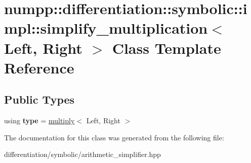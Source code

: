 \hypertarget{classnumpp_1_1differentiation_1_1symbolic_1_1impl_1_1simplify__multiplication}{}\section{numpp\+:\+:differentiation\+:\+:symbolic\+:\+:impl\+:\+:simplify\+\_\+multiplication$<$ Left, Right $>$ Class Template Reference}
\label{classnumpp_1_1differentiation_1_1symbolic_1_1impl_1_1simplify__multiplication}
\subsection*{Public Types}
\begin{DoxyCompactItemize}
\item 
\mbox{\label{classnumpp_1_1differentiation_1_1symbolic_1_1impl_1_1simplify__multiplication_a331a54bd1241728c0ce0d84ef0e529bf}} 
using {\bfseries type} = \hyperlink{classnumpp_1_1differentiation_1_1symbolic_1_1multiply}{multiply}$<$ Left, Right $>$
\end{DoxyCompactItemize}


The documentation for this class was generated from the following file\+:\begin{DoxyCompactItemize}
\item 
differentiation/symbolic/arithmetic\+\_\+simplifier.\+hpp\end{DoxyCompactItemize}
